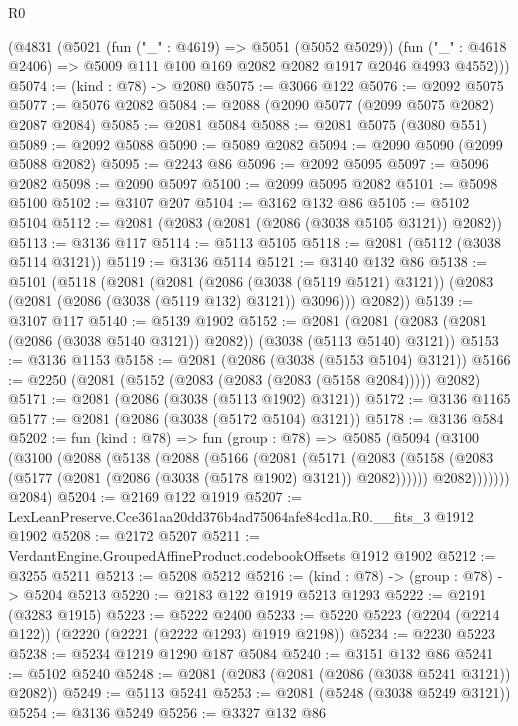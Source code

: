 \begin{lexlean}{R0}
\begin{coremodule}
    (@4831
      (@5021
        (fun ("_" : @4619) => @5051 (@5052 @5029))
        (fun ("_" : @4618 @2406) => @5009 @111 @100 @169 @2082 @2082 @1917 @2046 @4993 @4552)))
@5074 := (kind : @78) -> @2080
@5075 := @3066 @122
@5076 := @2092 @5075
@5077 := @5076 @2082
@5084 := @2088 (@2090 @5077 (@2099 @5075 @2082) @2087 @2084)
@5085 := @2081 @5084
@5088 := @2081 @5075 (@3080 @551)
@5089 := @2092 @5088
@5090 := @5089 @2082
@5094 := @2090 @5090 (@2099 @5088 @2082)
@5095 := @2243 @86
@5096 := @2092 @5095
@5097 := @5096 @2082
@5098 := @2090 @5097
@5100 := @2099 @5095 @2082
@5101 := @5098 @5100
@5102 := @3107 @207
@5104 := @3162 @132 @86
@5105 := @5102 @5104
@5112 := @2081 (@2083 (@2081 (@2086 (@3038 @5105 @3121)) @2082))
@5113 := @3136 @117
@5114 := @5113 @5105
@5118 := @2081 (@5112 (@3038 @5114 @3121))
@5119 := @3136 @5114
@5121 := @3140 @132 @86
@5138 := @5101
    (@5118
      (@2081
        (@2081
          (@2086 (@3038 (@5119 @5121) @3121))
          (@2083 (@2081 (@2086 (@3038 (@5119 @132) @3121)) @3096)))
        @2082))
@5139 := @3107 @117
@5140 := @5139 @1902
@5152 := @2081 (@2081 (@2083 (@2081 (@2086 (@3038 @5140 @3121)) @2082)) (@3038 (@5113 @5140) @3121))
@5153 := @3136 @1153
@5158 := @2081 (@2086 (@3038 (@5153 @5104) @3121))
@5166 := @2250 (@2081 (@5152 (@2083 (@2083 (@2083 (@5158 @2084))))) @2082)
@5171 := @2081 (@2086 (@3038 (@5113 @1902) @3121))
@5172 := @3136 @1165
@5177 := @2081 (@2086 (@3038 (@5172 @5104) @3121))
@5178 := @3136 @584
@5202 := fun (kind : @78) =>
  fun (group : @78) =>
  @5085
    (@5094
      (@3100
        (@3100
          (@2088
            (@5138
              (@2088
                (@5166
                  (@2081
                    (@5171
                      (@2083
                        (@5158 (@2083 (@5177 (@2081 (@2086 (@3038 (@5178 @1902) @3121)) @2082))))))
                    @2082)))))))
      @2084)
@5204 := @2169 @122 @1919
@5207 := LexLeanPreserve.Cce361aa20dd376b4ad75064afe84cd1a.R0.__fits_3 @1912 @1902
@5208 := @2172 @5207
@5211 := VerdantEngine.GroupedAffineProduct.codebookOffsets @1912 @1902
@5212 := @3255 @5211
@5213 := @5208 @5212
@5216 := (kind : @78) -> (group : @78) -> @5204 @5213
@5220 := @2183 @122 @1919 @5213 @1293
@5222 := @2191 (@3283 @1915)
@5223 := @5222 @2400
@5233 := @5220 @5223 (@2204 (@2214 @122)) (@2220 (@2221 (@2222 @1293) @1919 @2198))
@5234 := @2230 @5223
@5238 := @5234 @1219 @1290 @187 @5084
@5240 := @3151 @132 @86
@5241 := @5102 @5240
@5248 := @2081 (@2083 (@2081 (@2086 (@3038 @5241 @3121)) @2082))
@5249 := @5113 @5241
@5253 := @2081 (@5248 (@3038 @5249 @3121))
@5254 := @3136 @5249
@5256 := @3327 @132 @86

\end{coremodule}
\end{lexlean}
